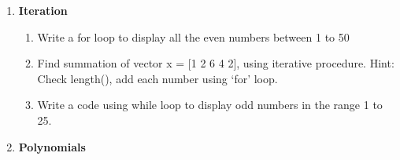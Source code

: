 \documentclass[12pt,a4paper]{article}
\newenvironment{enumcpt}{\begin{enumerate} \topsep -3mm \partopsep -3mm 
                        \parsep -3mm
                        \itemsep -0mm \leftmargin -1in \rightmargin -3mm
                        }{\end{enumerate}}
\begin{document}
\begin{multicols}{2}
\begin{enumcpt}
\begin{enumcpt}
\item  Write a code to check if a number is less than 10, if yes, then
display `$>10$', if it is greater than 10,
then display `$> 10$', else display the number. (for $n= 4, 13$ and 10)
%  
%  
% 
\end{enumcpt}
\item {\bf Iteration}
\begin{enumcpt}
\item  Write a for loop to display all the even numbers between 1 to 50
%  
\item  Find summation of vector x = [1 2 6 4 2], using iterative
procedure. {Hint: Check length(), add each number using `for' loop.}
\item  Write a code using while loop to display odd numbers in
the range 1 to 25.
\end{enumcpt}

\item {\bf Polynomials}
\begin{enumcpt}


\end{enumcpt}
\end{enumcpt}
\end{multicols}
\end{document}
